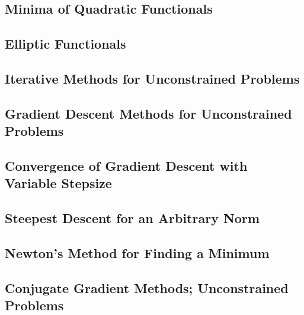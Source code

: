 \documentclass[a4paper]{article}
\begin{document}
\subsection{ Minima of Quadratic Functionals} %

\subsection{ Elliptic Functionals} %

\subsection{ Iterative Methods for Unconstrained Problems} %

\subsection{ Gradient Descent Methods for Unconstrained Problems} %

\subsection{ Convergence of Gradient Descent with Variable Stepsize} %

\subsection{ Steepest Descent for an Arbitrary Norm} %

\subsection{ Newton's Method for Finding a Minimum} %

\subsection{ Conjugate Gradient Methods; Unconstrained Problems} %
\end{document}
